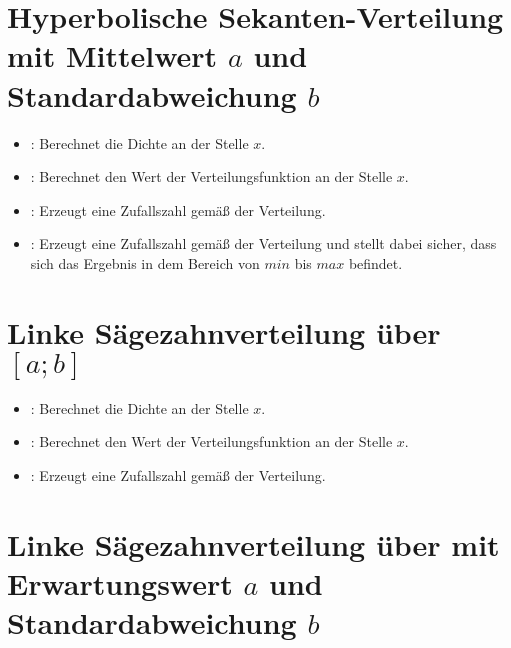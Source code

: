 \section{Hyperbolische Sekanten-Verteilung mit Mittelwert \texorpdfstring{$a$}{a} und Standardabweichung \texorpdfstring{$b$}{b}}

\begin{itemize}

\item
{}:
Berechnet die Dichte an der Stelle $x$.

\item
{}:
Berechnet den Wert der Verteilungsfunktion an der Stelle $x$.

\item
{}:
Erzeugt eine Zufallszahl gemäß der Verteilung.

\item
{}:
Erzeugt eine Zufallszahl gemäß der Verteilung und stellt dabei sicher, dass sich das Ergebnis in dem Bereich von $min$ bis $max$ befindet.

\end{itemize}



\section{Linke Sägezahnverteilung über \texorpdfstring{$[a;b]$}{[a;b]}}

\begin{itemize}

\item
{}:
Berechnet die Dichte an der Stelle $x$.

\item
{}:
Berechnet den Wert der Verteilungsfunktion an der Stelle $x$.

\item
{}:
Erzeugt eine Zufallszahl gemäß der Verteilung.

\end{itemize}



\section{Linke Sägezahnverteilung über mit Erwartungswert \texorpdfstring{$a$}{a} und Standardabweichung \texorpdfstring{$b$}{b}}

